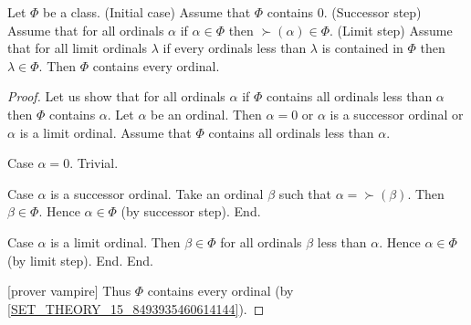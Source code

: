 \documentclass[../set-theory.tex]{subfiles}
\begin{document}
  \begin{forthel}
    \begin{theorem}\label{SET_THEORY_15_7892040431960064}
      Let $\Phi$ be a class.
      (Initial case) Assume that $\Phi$ contains $0$.
      (Successor step) Assume that for all ordinals $\alpha$ if
      $\alpha \in \Phi$ then $\succ(\alpha) \in \Phi$.
      (Limit step) Assume that for all limit ordinals $\lambda$ if every
      ordinals less than $\lambda$ is contained in $\Phi$ then
      $\lambda \in \Phi$.
      Then $\Phi$ contains every ordinal.
    \end{theorem}
    \begin{proof}
      Let us show that for all ordinals $\alpha$ if $\Phi$ contains all ordinals
      less than $\alpha$ then $\Phi$ contains $\alpha$.
        Let $\alpha$ be an ordinal.
        Then $\alpha = 0$ or $\alpha$ is a successor ordinal or $\alpha$ is a
        limit ordinal.
        Assume that $\Phi$ contains all ordinals less than $\alpha$.

        Case $\alpha = 0$. Trivial.

        Case $\alpha$ is a successor ordinal.
          Take an ordinal $\beta$ such that $\alpha = \succ(\beta)$.
          Then $\beta \in \Phi$.
          Hence $\alpha \in \Phi$ (by successor step).
        End.

        Case $\alpha$ is a limit ordinal.
          Then $\beta \in \Phi$ for all ordinals $\beta$ less than $\alpha$.
          Hence $\alpha \in \Phi$ (by limit step).
        End.
      End.

      [prover vampire] %
      Thus $\Phi$ contains every ordinal (by
      \ref{SET_THEORY_15_8493935460614144}).
    \end{proof}
  \end{forthel}
\end{document}
